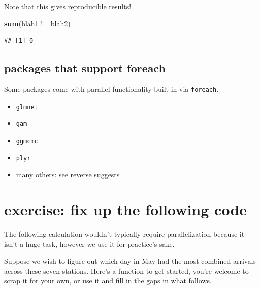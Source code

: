 \documentclass[]{article}
\newenvironment{Shaded}{\begin{snugshade}}{\end{snugshade}}
\newcommand{\KeywordTok}[1]{\textcolor[rgb]{0.13,0.29,0.53}{\textbf{{#1}}}}
\newcommand{\DataTypeTok}[1]{\textcolor[rgb]{0.13,0.29,0.53}{{#1}}}
\newcommand{\StringTok}[1]{\textcolor[rgb]{0.31,0.60,0.02}{{#1}}}
\newcommand{\OtherTok}[1]{\textcolor[rgb]{0.56,0.35,0.01}{{#1}}}
\newcommand{\NormalTok}[1]{{#1}}
\begin{document}
Note that this gives reproducible results!

\begin{Shaded}
\begin{Highlighting}[]
\KeywordTok{sum}\NormalTok{(blah1 !=}\StringTok{ }\NormalTok{blah2) }
\end{Highlighting}
\end{Shaded}

\begin{verbatim}
## [1] 0
\end{verbatim}

\subsection{packages that support
foreach}\label{packages-that-support-foreach}

Some packages come with parallel functionality built in via
\texttt{foreach}.

\begin{itemize}
\itemsep1pt\parskip0pt
\item
  \texttt{glmnet}
\item
  \texttt{gam}
\item
  \texttt{ggmcmc}
\item
  \texttt{plyr}
\item
  many others: see
  \href{http://cran.r-project.org/web/packages/foreach/index.html}{reverse
  suggests}
\end{itemize}

\section{{exercise}: fix up the following
code}\label{exercise-fix-up-the-following-code}

The following calculation wouldn't typically require parallelization
because it isn't a huge task, however we use it for practice's sake.

Suppose we wish to figure out which day in May had the most combined
arrivals across these seven stations. Here's a function to get started,
you're welcome to scrap it for your own, or use it and fill in the gaps
in what follows.

\begin{Shaded}
\end{Shaded}
\end{document}
